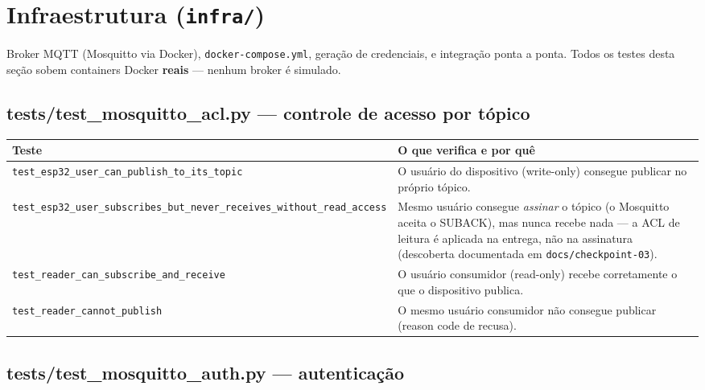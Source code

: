 \documentclass[10pt,a4paper]{article}
\begin{document}
\section{Infraestrutura (\texttt{infra/})}

Broker MQTT (Mosquitto via Docker), \texttt{docker-compose.yml}, geração de credenciais, e integração ponta a ponta. Todos os testes desta seção sobem containers Docker \textbf{reais} — nenhum broker é simulado.

\subsection{tests/test\_\allowbreak mosquitto\_\allowbreak acl.py --- controle de acesso por tópico}

\begin{center}
\begin{longtable}{L{5cm}L{9.5cm}}
\toprule
\textbf{Teste} & \textbf{O que verifica e por quê} \\
\midrule
\endhead
\texttt{test\_\allowbreak esp32\_\allowbreak user\_\allowbreak can\_\allowbreak publish\_\allowbreak to\_\allowbreak its\_\allowbreak topic} & O usuário do dispositivo (write-only) consegue publicar no próprio tópico. \\
\texttt{test\_\allowbreak esp32\_\allowbreak user\_\allowbreak subscribes\_\allowbreak but\_\allowbreak never\_\allowbreak receives\_\allowbreak without\_\allowbreak read\_\allowbreak access} & Mesmo usuário consegue \textit{assinar} o tópico (o Mosquitto aceita o SUBACK), mas nunca recebe nada — a ACL de leitura é aplicada na entrega, não na assinatura (descoberta documentada em \texttt{docs/checkpoint-03}). \\
\texttt{test\_\allowbreak reader\_\allowbreak can\_\allowbreak subscribe\_\allowbreak and\_\allowbreak receive} & O usuário consumidor (read-only) recebe corretamente o que o dispositivo publica. \\
\texttt{test\_\allowbreak reader\_\allowbreak cannot\_\allowbreak publish} & O mesmo usuário consumidor não consegue publicar (reason code de recusa). \\
\bottomrule
\end{longtable}
\end{center}

\subsection{tests/test\_\allowbreak mosquitto\_\allowbreak auth.py --- autenticação}
\end{document}
